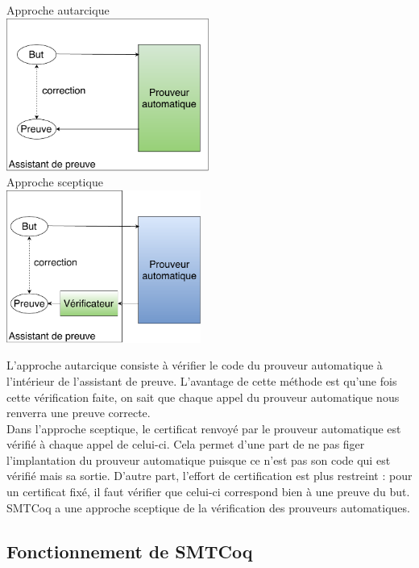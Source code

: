 \documentclass{article}
\begin{document}
\begin{multicols}{2}
\begin{center}
Approche autarcique\\
\includegraphics[height=5cm]{1_Autarcique.pdf}\\
Approche sceptique\\
\includegraphics[height=5cm]{2_Sceptique.pdf}\\

\end{center}
\end{multicols}

L'approche autarcique consiste à vérifier le code du prouveur automatique à l'intérieur de l'assistant de preuve. L'avantage de cette méthode est qu'une fois cette vérification faite, on sait que chaque appel du prouveur automatique nous renverra une preuve correcte. \\

Dans l'approche sceptique, le certificat renvoyé par le prouveur automatique est vérifié à chaque appel de celui-ci. Cela permet d'une part de ne pas figer l'implantation du prouveur automatique puisque ce n'est pas son code qui est vérifié mais sa sortie. D'autre part, l'effort de certification est plus restreint : pour un certificat fixé, il faut vérifier que celui-ci correspond bien à une preuve du but.\\

SMTCoq a une approche sceptique de la vérification des prouveurs automatiques.

\subsection{Fonctionnement de SMTCoq}
\end{document}
